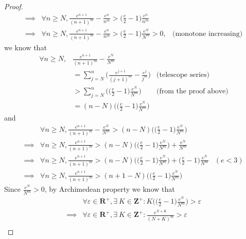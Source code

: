 \begin{proof}
\begin{align*}
        \implies & \forall n \geq N, \frac{e^{n + 1}}{(n + 1)^m} - \frac{e^n}{n^m} > \bigg(\frac{e}{2} - 1\bigg) \frac{e^n}{n^m}                                     \\
        \implies & \forall n \geq N, \frac{e^{n + 1}}{(n + 1)^m} - \frac{e^n}{n^m} > \bigg(\frac{e}{2} - 1\bigg) \frac{e^N}{N^m} > 0, & \text{(monotone increasing)}
    \end{align*}
    we know that
    \begin{align*}
        \forall n \geq N, & \frac{e^{n + 1}}{(n + 1)^m} - \frac{e^N}{N^m}                                                              \\
                          & = \sum_{j = N}^n \bigg(\frac{e^{j + 1}}{(j + 1)^m} - \frac{e^j}{j^m}\bigg) & \text{(telescope series)}     \\
                          & > \sum_{j = N}^n \Bigg(\bigg(\frac{e}{2} - 1\bigg) \frac{e^N}{N^m}\Bigg)   & \text{(from the proof above)} \\
                          & = (n - N) \Bigg(\bigg(\frac{e}{2} - 1\bigg) \frac{e^N}{N^m}\Bigg)
    \end{align*}
    and
    \begin{align*}
                 & \forall n \geq N, \frac{e^{n + 1}}{(n + 1)^m} - \frac{e^N}{N^m} > (n - N) \Bigg(\bigg(\frac{e}{2} - 1\bigg) \frac{e^N}{N^m}\Bigg)                                       \\
        \implies & \forall n \geq N, \frac{e^{n + 1}}{(n + 1)^m} > (n - N) \Bigg(\bigg(\frac{e}{2} - 1\bigg) \frac{e^N}{N^m}\Bigg) + \frac{e^N}{N^m}                                       \\
        \implies & \forall n \geq N, \frac{e^{n + 1}}{(n + 1)^m} > (n - N) \Bigg(\bigg(\frac{e}{2} - 1\bigg) \frac{e^N}{N^m}\Bigg) + \bigg(\frac{e}{2} - 1\bigg) \frac{e^N}{N^m} & (e < 3) \\
        \implies & \forall n \geq N, \frac{e^{n + 1}}{(n + 1)^m} > (n + 1 - N) \Bigg(\bigg(\frac{e}{2} - 1\bigg) \frac{e^N}{N^m}\Bigg)
    \end{align*}
    Since \(\frac{e^N}{N^m} > 0\), by Archimedean property we know that
    \begin{align*}
                 & \forall \varepsilon \in \mathbf{R}^+, \exists\ K \in \mathbf{Z}^+ : K \Bigg(\bigg(\frac{e}{2} - 1\bigg) \frac{e^N}{N^m}\Bigg) > \varepsilon                                \\
        \implies & \forall \varepsilon \in \mathbf{R}^+, \exists\ K \in \mathbf{Z}^+ : \frac{e^{N + K}}{(N + K)^m} > \varepsilon                                                              \\

\end{align*}
\end{proof}
